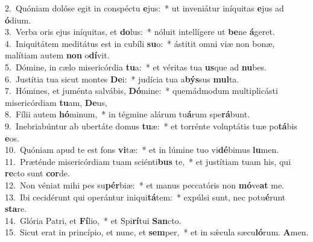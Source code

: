 {2.~}Quóniam dolóse egit in conspéctu \textbf{e}jus:~* ut inveniátur iníquitas \textbf{e}jus ad \textbf{ó}dium.\\
{3.~}Verba oris ejus iníquitas, et \textbf{do}lus:~* nóluit intellígere ut \textbf{be}ne \textbf{á}geret.\\
{4.~}Iniquitátem meditátus est in cubíli \textbf{su}o:~* ástitit omni viæ non bonæ, malítiam autem \textbf{non} o\textbf{dí}vit.\\
{5.~}Dómine, in cælo misericórdia \textbf{tu}a:~* et véritas tua \textbf{us}que ad \textbf{nu}bes.\\
{6.~}Justítia tua sicut montes \textbf{De}i:~* judícia tua a\textbf{býs}sus \textbf{mul}ta.\\
{7.~}Hómines, et juménta salvábis, \textbf{Dó}mine:~* quemádmodum multiplicásti misericórdiam \textbf{tu}am, \textbf{De}us,\\
{8.~}Fílii autem \textbf{hó}minum,~* in tégmine alárum tu\textbf{á}rum spe\textbf{rá}bunt.\\
{9.~}Inebriabúntur ab ubertáte domus \textbf{tu}æ:~* et torrénte voluptátis tuæ po\textbf{tá}bis \textbf{e}os.\\
{10.~}Quóniam apud te est fons \textbf{vi}tæ:~* et in lúmine tuo vi\textbf{dé}bimus \textbf{lu}men.\\
{11.~}Præténde misericórdiam tuam sciénti\textbf{bus} te,~* et justítiam tuam his, qui \textbf{re}cto sunt \textbf{cor}de.\\
{12.~}Non véniat mihi pes su\textbf{pér}biæ:~* et manus peccatóris non \textbf{mó}ve\textbf{at} me.\\
{13.~}Ibi cecidérunt qui operántur iniqui\textbf{tá}tem:~* expúlsi sunt, nec potu\textbf{é}runt \textbf{sta}re.\\
{14.~}Glória Patri, et \textbf{Fí}lio,~* et Spi\textbf{rí}tui \textbf{San}cto.\\
{15.~}Sicut erat in princípio, et nunc, et \textbf{sem}per,~* et in sǽcula sæcu\textbf{ló}rum. \textbf{A}men.\\
